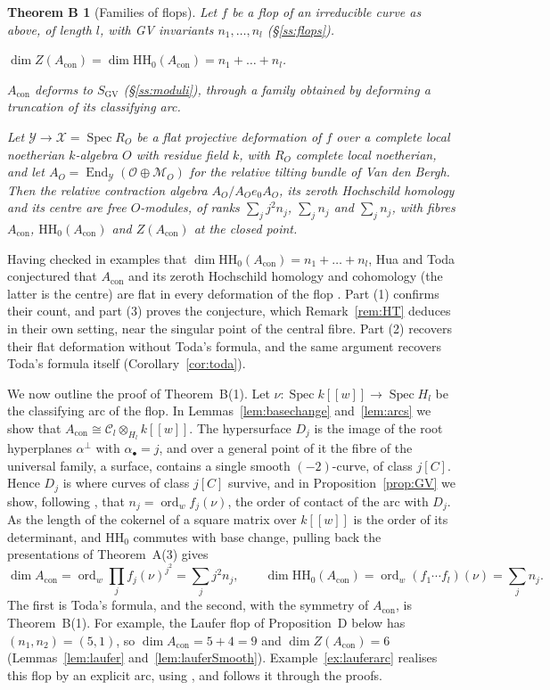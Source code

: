 \documentclass[11pt]{amsart}
\numberwithin{table}{section}
\numberwithin{figure}{section}
\numberwithin{equation}{section}
\theoremstyle{definition}
\theoremstyle{plain}
\newtheorem*{thmB}{Theorem B}
\newcommand{\Acon}{A_{\mathrm{con}}}
\newcommand{\cC}{\mathcal{C}}
\newcommand{\cO}{\mathcal{O}}
\newcommand{\bul}{\bullet}
\newcommand{\SGV}{S_{\mathrm{GV}}}
\newcommand{\HH}{\mathrm{HH}}
\DeclareMathOperator{\Spec}{Spec}
\DeclareMathOperator{\End}{End}
\DeclareMathOperator{\ord}{ord}
\begin{document}
\begin{thmB}[Families of flops]
Let $f$ be a flop of an irreducible curve as above, of length $l$, with GV invariants $n_1, \dots, n_l$ (\S\ref{ss:flops}).
\begin{thmlist}
\item $\dim Z(\Acon) = \dim \HH_0(\Acon) = n_1 + \dots + n_l$.
\item $\Acon$ deforms to $\SGV$ (\S\ref{ss:moduli}), through a family obtained by deforming a truncation of its classifying arc.
\item Let $\mathcal Y \to \mathcal X = \Spec R_O$ be a flat projective deformation of $f$ over a complete local noetherian $k$-algebra $O$ with residue field $k$, with $R_O$ complete local noetherian, and let $A_O = \End_{\mathcal Y}(\cO \oplus \mathcal M_O)$ for the relative tilting bundle of Van den Bergh. Then the relative contraction algebra $A_O/A_Oe_0A_O$, its zeroth Hochschild homology and its centre are free $O$-modules, of ranks $\sum_j j^2 n_j$, $\sum_j n_j$ and $\sum_j n_j$, with fibres $\Acon$, $\HH_0(\Acon)$ and $Z(\Acon)$ at the closed point.
\end{thmlist}
\end{thmB}

Having checked in examples that $\dim \HH_0(\Acon) = n_1 + \dots + n_l$, Hua and Toda conjectured that $\Acon$ and its zeroth Hochschild homology and cohomology (the latter is the centre) are flat in every deformation of the flop \cite[Conj~4.3]{HT}. Part (1) confirms their count, and part (3) proves the conjecture, which Remark~\ref{rem:HT} deduces in their own setting, near the singular point of the central fibre. Part (2) recovers their flat deformation without Toda's formula, and the same argument recovers Toda's formula itself (Corollary~\ref{cor:toda}).

We now outline the proof of Theorem~B(1). Let $\nu\colon \Spec k[[w]] \to \Spec H_l$ be the classifying arc of the flop. In Lemmas~\ref{lem:basechange} and~\ref{lem:arcs} we show that $\Acon \cong \cC_l \otimes_{H_l} k[[w]]$. The hypersurface $D_j$ is the image of the root hyperplanes $\alpha^\perp$ with $\alpha_\bul = j$, and over a general point of it the fibre of the universal family, a surface, contains a single smooth $(-2)$-curve, of class $j[C]$. Hence $D_j$ is where curves of class $j[C]$ survive, and in Proposition~\ref{prop:GV} we show, following \cite{BKL}, that $n_j = \ord_w f_j(\nu)$, the order of contact of the arc with $D_j$. As the length of the cokernel of a square matrix over $k[[w]]$ is the order of its determinant, and $\HH_0$ commutes with base change, pulling back the presentations of Theorem~A(3) gives
\[
\dim \Acon = \ord_w \prod_{j} f_j(\nu)^{j^2} = \sum_{j} j^2 n_j, \qquad \dim \HH_0(\Acon) = \ord_w (f_1 \cdots f_l)(\nu) = \sum_{j} n_j .
\]
The first is Toda's formula, and the second, with the symmetry of $\Acon$, is Theorem~B(1). For example, the Laufer flop of Proposition~D below has $(n_1, n_2) = (5, 1)$, so $\dim \Acon = 5 + 4 = 9$ and $\dim Z(\Acon) = 6$ (Lemmas~\ref{lem:laufer} and~\ref{lem:lauferSmooth}). Example~\ref{ex:lauferarc} realises this flop by an explicit arc, using \cite{JKM,KLW}, and follows it through the proofs.
\end{document}

